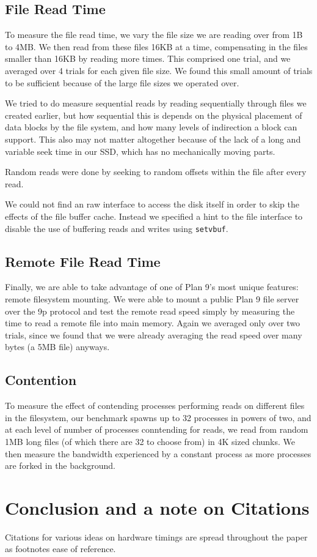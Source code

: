 \documentclass[letterpaper,twocolumn,10pt]{article}
\begin{document}
\subsection{File Read Time}
To measure the file read time, we vary the file size we are reading over from
1B to 4MB. We then read from these files 16KB at a time, compensating in the
files smaller than 16KB by reading more times. This comprised one trial, and we
averaged over 4 trials for each given file size. We found this small amount of
trials to be sufficient because of the large file sizes we operated over.

We tried to do measure sequential reads by reading sequentially through files
we created earlier, but how sequential this is depends on the physical
placement of data blocks by the file system, and how many levels of indirection
a block can support. This also may not matter altogether because of the lack of
a long and variable seek time in our SSD, which has no mechanically moving
parts.

Random reads were done by seeking to random offsets within the file after every
read. 

We could not find an raw interface to access the disk itself in order to skip
the effects of the file buffer cache. Instead we specified a hint to the file
interface to disable the use of buffering reads and writes using
\texttt{setvbuf}.

\subsection{Remote File Read Time}
Finally, we are able to take advantage of one of Plan 9's most unique features:
remote filesystem mounting. We were able to mount a public Plan 9 file server
over the 9p protocol and test the remote read speed simply by measuring the
time to read a remote file into main memory. Again we averaged only over two
trials, since we found that we were already averaging the read speed over many
bytes (a 5MB file) anyways.

\subsection{Contention}
To measure the effect of contending processes performing reads on different
files in the filesystem, our benchmark spawns up to 32 processes in powers of
two, and at each level of number of processes conntending for reads, we read
from random 1MB long files (of which there are 32 to choose from) in 4K sized 
chunks. We then measure the bandwidth experienced by a constant process as more
processes are forked in the background.

\section{Conclusion and a note on Citations}

Citations for various ideas on hardware timings are spread throughout the paper as footnotes 
ease of reference. 



{\normalsize 
}


\end{document}
